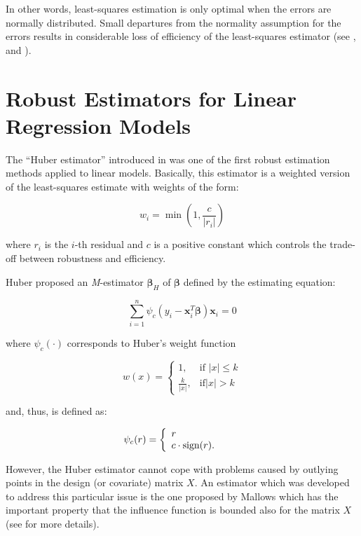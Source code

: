 \documentclass[]{book}
\theoremstyle{definition}
\theoremstyle{definition}
\theoremstyle{definition}
\theoremstyle{remark}
\begin{document}
In other words, least-squares estimation is only optimal when the errors
are normally distributed. Small departures from the normality assumption
for the errors results in considerable loss of efficiency of the
least-squares estimator (see \citet{hampel1987robust},
\citet{huber1973robust} and \citet{hampel1973robust}).

\hypertarget{robust-estimators-for-linear-regression-models}{%
\section{Robust Estimators for Linear Regression
Models}\label{robust-estimators-for-linear-regression-models}}

The ``Huber estimator'' introduced in \citet{huber1973robust} was one of
the first robust estimation methods applied to linear models. Basically,
this estimator is a weighted version of the least-squares estimate with
weights of the form:

\[
w_{i} = \min \left(1,\frac{c}{|r_{i}|}\right)
\]

where \(r_{i}\) is the \(i\)-th residual and \(c\) is a positive
constant which controls the trade-off between robustness and efficiency.

Huber proposed an \textit{M}-estimator \(\hat{\boldsymbol{\beta}}_{H}\)
of \(\boldsymbol{\beta}\) defined by the estimating equation:

\[
    \sum_{i = 1}^{n} \psi_{c}\left(y_{i} - \mathbf{x}_{i}^{T} \boldsymbol{\beta} \right)\mathbf{x}_{i} = 0
\]

where \(\psi_{c}(\cdot)\) corresponds to Huber's weight function

\begin{equation}
w\left({x}\right) = \begin{cases}
1, &\text{if } \left|{x}\right| \le k \\
\frac{k}{\left|{x}\right|}, &\text{if} \left|{x}\right| > k
\end{cases}
\label{eq:huberweight}
\end{equation}

and, thus, is defined as:

\[
\psi_{c}(r) = \left\{  
\begin{array}{l l}
  r & \quad \\
  c \cdot \text{sign}(r). & \quad \\
\end{array} \right. 
\]

However, the Huber estimator cannot cope with problems caused by
outlying points in the design (or covariate) matrix \(X\). An estimator
which was developed to address this particular issue is the one proposed
by Mallows which has the important property that the influence function
is bounded also for the matrix \(X\) (see \citet{krasker1980estimation}
for more details).
\end{document}
